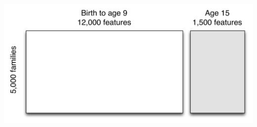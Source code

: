 \documentclass{beamer}
\begin{document}
\begin{frame}

\begin{center}
\end{center}

\end{frame}
\begin{frame}

\begin{center}
\includegraphics[width=\textwidth]{figures/ff_design_matrix_ml}
\end{center}

\end{frame}
\end{document}
